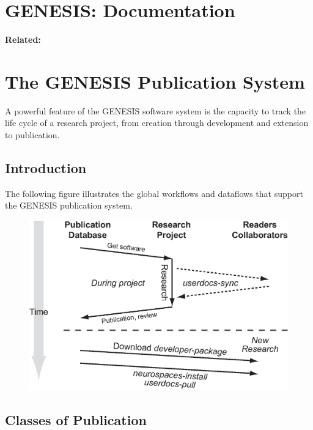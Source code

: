 \documentclass[12pt]{article}
\begin{document}
\section*{GENESIS: Documentation}

{\bf Related:}

\section*{The GENESIS Publication System}

A powerful feature of the GENESIS software system is the capacity to track the life cycle of a research project, from creation through development and extension to publication.

\subsection*{Introduction}

The following figure illustrates the global workflows and dataflows that support the GENESIS publication system.

\begin{figure}[h]
  \centering
   \includegraphics[scale=0.6]{figures/global-workdata-flow.eps}
  \label{fig:wf-1}
\end{figure}

\subsection*{Classes of Publication}
\end{document}
